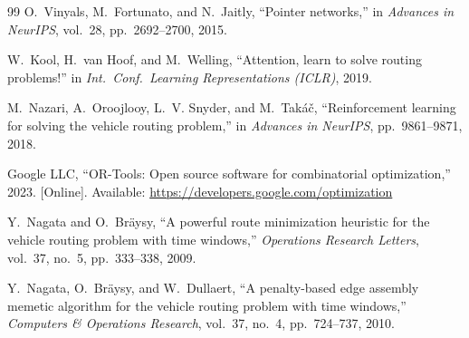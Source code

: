 \documentclass[conference]{IEEEtran}
\begin{document}
\begin{thebibliography}{99}
O.~Vinyals, M.~Fortunato, and N.~Jaitly,
``Pointer networks,''
in \textit{Advances in NeurIPS}, vol.~28, pp.~2692--2700, 2015.

W.~Kool, H.~van Hoof, and M.~Welling,
``Attention, learn to solve routing problems!''
in \textit{Int.\ Conf.\ Learning Representations (ICLR)}, 2019.

M.~Nazari, A.~Oroojlooy, L.~V. Snyder, and M.~Tak\'{a}\v{c},
``Reinforcement learning for solving the vehicle routing problem,''
in \textit{Advances in NeurIPS}, pp.~9861--9871, 2018.

Google LLC,
``OR-Tools: Open source software for combinatorial optimization,''
2023. [Online]. Available: \url{https://developers.google.com/optimization}

Y.~Nagata and O.~Br\"aysy,
``A powerful route minimization heuristic for the vehicle routing problem with
time windows,''
\textit{Operations Research Letters}, vol.~37, no.~5, pp.~333--338, 2009.

Y.~Nagata, O.~Br\"aysy, and W.~Dullaert,
``A penalty-based edge assembly memetic algorithm for the vehicle routing
problem with time windows,''
\textit{Computers \& Operations Research}, vol.~37, no.~4, pp.~724--737, 2010.

\end{thebibliography}
\end{document}
